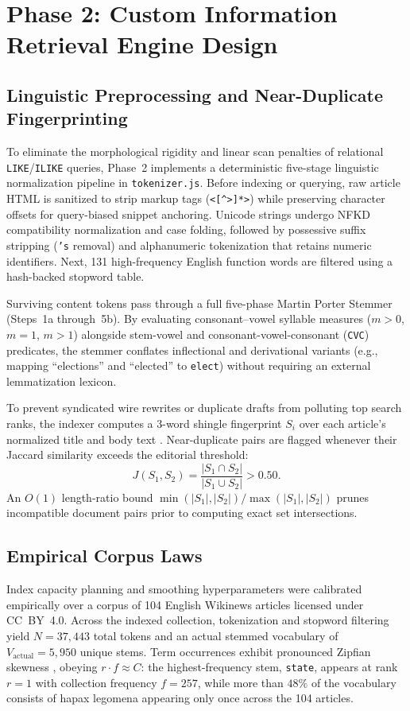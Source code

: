 \documentclass[conference]{IEEEtran}
\begin{document}
\section{Phase 2: Custom Information Retrieval Engine Design}

\subsection{Linguistic Preprocessing and Near-Duplicate Fingerprinting}
To eliminate the morphological rigidity and linear scan penalties of relational \texttt{LIKE}/\texttt{ILIKE} queries, Phase~2 implements a deterministic five-stage linguistic normalization pipeline in \texttt{tokenizer.js}. Before indexing or querying, raw article HTML is sanitized to strip markup tags (\texttt{<[^>]*>}) while preserving character offsets for query-biased snippet anchoring. Unicode strings undergo NFKD compatibility normalization and case folding, followed by possessive suffix stripping (\texttt{'s} removal) and alphanumeric tokenization that retains numeric identifiers. Next, 131 high-frequency English function words are filtered using a hash-backed stopword table.

Surviving content tokens pass through a full five-phase Martin Porter Stemmer \cite{b5} (Steps~1a through~5b). By evaluating consonant--vowel syllable measures ($m > 0$, $m = 1$, $m > 1$) alongside stem-vowel and consonant-vowel-consonant (\texttt{CVC}) predicates, the stemmer conflates inflectional and derivational variants (e.g., mapping ``elections'' and ``elected'' to \texttt{elect}) without requiring an external lemmatization lexicon.

To prevent syndicated wire rewrites or duplicate drafts from polluting top search ranks, the indexer computes a 3-word shingle fingerprint $S_i$ over each article's normalized title and body text \cite{b6}. Near-duplicate pairs are flagged whenever their Jaccard similarity exceeds the editorial threshold:
\begin{equation}
J(S_1, S_2) = \frac{|S_1 \cap S_2|}{|S_1 \cup S_2|} > 0.50.
\label{eq:jaccard}
\end{equation}
An $O(1)$ length-ratio bound $\min(|S_1|,|S_2|)/\max(|S_1|,|S_2|)$ prunes incompatible document pairs prior to computing exact set intersections.

\subsection{Empirical Corpus Laws}
Index capacity planning and smoothing hyperparameters were calibrated empirically over a corpus of 104 English Wikinews articles licensed under CC~BY~4.0. Across the indexed collection, tokenization and stopword filtering yield $N = 37{,}443$ total tokens and an actual stemmed vocabulary of $V_{\text{actual}} = 5{,}950$ unique stems. Term occurrences exhibit pronounced Zipfian skewness \cite{b7}, obeying $r \cdot f \approx C$: the highest-frequency stem, \texttt{state}, appears at rank $r = 1$ with collection frequency $f = 257$, while more than $48\%$ of the vocabulary consists of hapax legomena appearing only once across the 104 articles.
\end{document}
